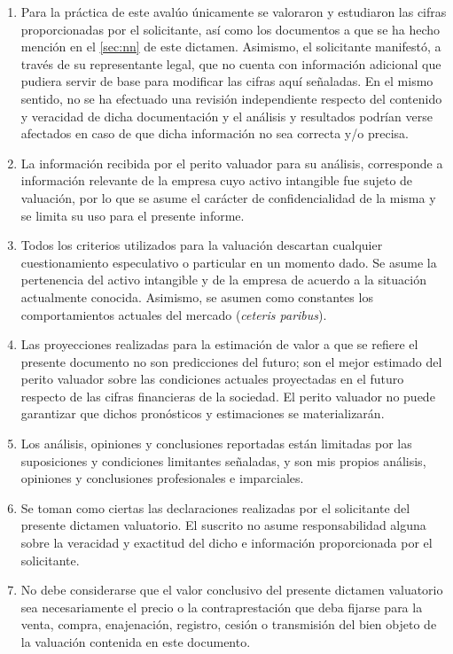 \begin{enumerate}[\indent a)]
\item Para la práctica de este avalúo únicamente se valoraron y estudiaron las cifras proporcionadas por el solicitante, así como los documentos a que se ha hecho mención en el \autoref{sec:nn} de este dictamen. Asimismo, el solicitante manifestó, a través de su representante legal, que no cuenta con información adicional que pudiera servir de base para modificar las cifras aquí señaladas. En el mismo sentido, no se ha efectuado una revisión independiente respecto del contenido y veracidad de dicha documentación y el análisis y resultados podrían verse afectados en caso de que dicha información no sea correcta y/o precisa.

\item La información recibida por el perito valuador para su análisis, corresponde a información relevante de la empresa cuyo activo intangible fue sujeto de valuación, por lo que se asume el carácter de confidencialidad de la misma y se limita su uso para el presente informe.

\item Todos los criterios utilizados para la valuación descartan cualquier cuestionamiento especulativo o particular en un momento dado. Se asume la pertenencia del activo intangible y de la empresa de acuerdo a la situación actualmente conocida. Asimismo, se asumen como constantes los comportamientos actuales del mercado (\textit{ceteris paribus}).

\item Las proyecciones realizadas para la estimación de valor a que se refiere el presente documento no son predicciones del futuro; son el mejor estimado del perito valuador sobre las condiciones actuales proyectadas en el futuro respecto de las cifras financieras de la sociedad. El perito valuador no puede garantizar que dichos pronósticos y estimaciones se materializarán.

\item Los análisis, opiniones y conclusiones reportadas están limitadas por las suposiciones y condiciones limitantes señaladas, y son mis propios análisis, opiniones y conclusiones profesionales e imparciales.

\item Se toman como ciertas las declaraciones realizadas por el solicitante del presente dictamen valuatorio. El suscrito no asume responsabilidad alguna sobre la veracidad y exactitud del dicho e información proporcionada por el solicitante.

\item No debe considerarse que el valor conclusivo del presente dictamen valuatorio sea necesariamente el precio o la contraprestación que deba fijarse para la venta, compra, enajenación, registro, cesión o transmisión del bien objeto de la valuación  contenida en este documento.


\end{enumerate}
